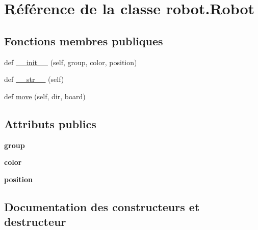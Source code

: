 \hypertarget{classrobot_1_1Robot}{}\section{Référence de la classe robot.\+Robot}
\label{classrobot_1_1Robot}
\subsection*{Fonctions membres publiques}
\begin{DoxyCompactItemize}
\item 
def \hyperlink{classrobot_1_1Robot_a79a4241cf6242acb65cd51b1c67dd263}{\+\_\+\+\_\+init\+\_\+\+\_\+} (self, group, color, position)
\item 
def \hyperlink{classrobot_1_1Robot_a10d00e1924a0fce095fe0bdf888f1415}{\+\_\+\+\_\+str\+\_\+\+\_\+} (self)
\item 
def \hyperlink{classrobot_1_1Robot_a0227c4a66b9a23adb02a9ddf441be825}{move} (self, dir, board)
\end{DoxyCompactItemize}
\subsection*{Attributs publics}
\begin{DoxyCompactItemize}
\item 
\mbox{\label{classrobot_1_1Robot_a3ad797bc28203e41705888907ccf1958}} 
{\bfseries group}
\item 
\mbox{\label{classrobot_1_1Robot_ac6f9cffab22675391c0726d78efa6e70}} 
{\bfseries color}
\item 
\mbox{\label{classrobot_1_1Robot_ac276dce901ab21472c05818cf7b44383}} 
{\bfseries position}
\end{DoxyCompactItemize}


\subsection{Documentation des constructeurs et destructeur}
\mbox{\label{classrobot_1_1Robot_a79a4241cf6242acb65cd51b1c67dd263}} 
